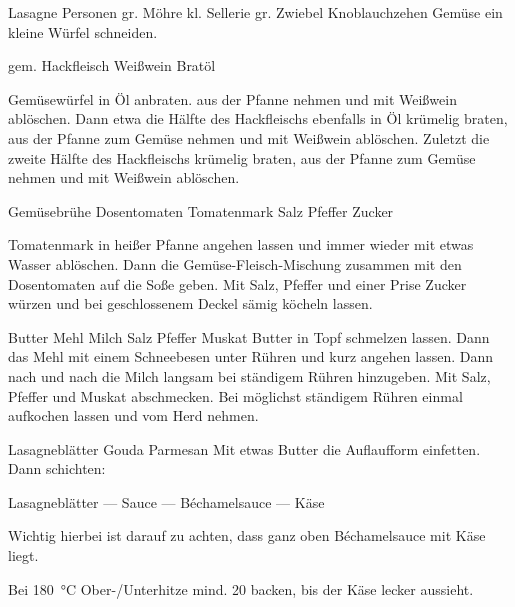 \begin{MyRecipe}{Lasagne}{ Personen}{}
	\ingredient[\Calc{1}{\x}]{} {gr. Möhre}
	\ingredient[\Calc{0.5}{\x}]{} {kl. Sellerie}
	\ingredient[\Calc{1}{\x}]{} {gr. Zwiebel}
	\ingredient[\Calc{2}{\x}]{} {Knoblauchzehen}
	Gemüse ein kleine Würfel schneiden.\par\bigskip
	
	
	\ingredient[\Calc{0.6}{\x}]{\si{\kilogram}} {gem. Hackfleisch}
	\ingredient[\Calc{0.2}{\x}]{\si{\liter}} {Weißwein}
	\ingredient[]{} {Bratöl}
	
	Gemüsewürfel in Öl anbraten. aus der Pfanne nehmen und mit Weißwein ablöschen. Dann etwa die Hälfte des Hackfleischs ebenfalls in Öl krümelig braten, aus der Pfanne zum Gemüse nehmen und mit Weißwein ablöschen. Zuletzt die zweite Hälfte des Hackfleischs krümelig braten, aus der Pfanne zum Gemüse nehmen und mit Weißwein ablöschen.\par\bigskip
	

	\ingredient[\Calc{0.5}{\x}]{\si{\liter}} {Gemüsebrühe}
	\ingredient[\Calc{0.4}{\x}]{\si{\kilogram}} {Dosentomaten}
	 {Tomatenmark}
	\ingredient[]{} {Salz}
	\ingredient[]{} {Pfeffer}
	\ingredient[]{} {Zucker}
	
	Tomatenmark in heißer Pfanne angehen lassen und immer wieder mit etwas Wasser ablöschen. Dann die Gemüse-Fleisch-Mischung zusammen mit den Dosentomaten auf die Soße geben. Mit Salz, Pfeffer und einer Prise Zucker würzen und bei geschlossenem Deckel sämig köcheln lassen.\par\bigskip
	
	 {Butter}
	 {Mehl}
	\ingredient[\Calc{0.5}{\x}]{\si{\liter}} {Milch}
	\ingredient[]{} {Salz}
	\ingredient[]{} {Pfeffer}
	\ingredient[]{} {Muskat}
	Butter in Topf schmelzen lassen. Dann das Mehl mit einem Schneebesen unter Rühren und kurz angehen lassen. Dann nach und nach die Milch langsam bei ständigem Rühren hinzugeben. Mit Salz, Pfeffer und Muskat abschmecken. Bei möglichst ständigem Rühren einmal aufkochen lassen und vom Herd nehmen.
	
	\ingredient[\Calc{12}{\x}]{} {Lasagneblätter}
	\ingredient[\Calc{0.3}{\x}]{\si{\kilogram}} {Gouda}
	\ingredient[\Calc{0.1}{\x}]{\si{\kilogram}} {Parmesan}
	Mit etwas Butter die Auflaufform einfetten. Dann schichten:\par
	Lasagneblätter --- Sauce --- Béchamelsauce --- Käse\par
	Wichtig hierbei ist darauf zu achten, dass ganz oben Béchamelsauce mit Käse liegt.\par\bigskip

	Bei \SI{180}{\degreeCelsius} Ober-/Unterhitze mind. \SI{20}{\min} backen, bis der Käse lecker aussieht.
	
	
	
\end{MyRecipe}
